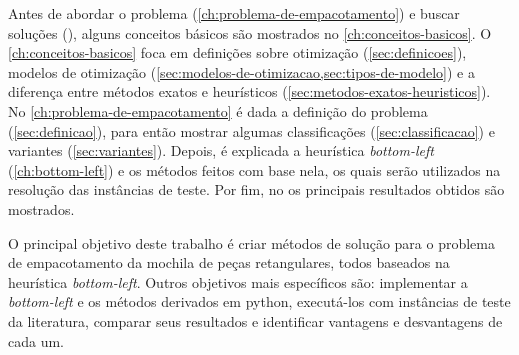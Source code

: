 Antes de abordar o problema (\autoref{ch:problema-de-empacotamento}) e buscar soluções
(), alguns conceitos básicos são mostrados no \autoref{ch:conceitos-basicos}.
O \autoref{ch:conceitos-basicos} foca em definições sobre otimização (\autoref{sec:definicoes}),
modelos de otimização (\cref{sec:modelos-de-otimizacao,sec:tipos-de-modelo}) e a diferença entre
métodos exatos e heurísticos (\cref{sec:metodos-exatos-heuristicos}).
No \autoref{ch:problema-de-empacotamento} é dada a definição do problema (\autoref{sec:definicao}),
para então mostrar algumas classificações (\autoref{sec:classificacao}) e variantes
(\autoref{sec:variantes}).
Depois, é explicada a heurística \textit{bottom-left} (\autoref{ch:bottom-left}) e os métodos feitos
com base nela, os quais serão utilizados na resolução das instâncias de teste.
Por fim, no  os principais resultados obtidos são mostrados.


O principal objetivo deste trabalho é criar métodos de solução para o problema de
empacotamento da mochila de peças retangulares, todos baseados na heurística \textit{bottom-left}.
Outros objetivos mais específicos são: implementar a \textit{bottom-left} e os métodos derivados em
python, executá-los com instâncias de teste da literatura, comparar seus resultados e identificar
vantagens e desvantagens de cada um.
